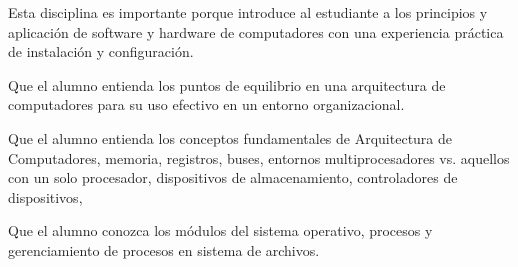 \begin{syllabus}


\begin{justification}
Esta disciplina es importante porque introduce al estudiante a los principios y aplicación de software y hardware de computadores con una experiencia práctica de instalación y configuración.
\end{justification}

\begin{goals}
\item Que el alumno entienda los puntos de equilibrio en una arquitectura de computadores para su uso efectivo en un entorno organizacional.
\item Que el alumno entienda los conceptos fundamentales de Arquitectura de Computadores, memoria, registros, buses, entornos multiprocesadores vs. aquellos con un solo procesador, dispositivos de almacenamiento, controladores de dispositivos, 
\item Que el alumno conozca los módulos del sistema operativo, procesos y gerenciamiento de procesos en sistema de archivos.
\end{goals}

\begin{outcomes}
\end{outcomes}


\end{syllabus}
